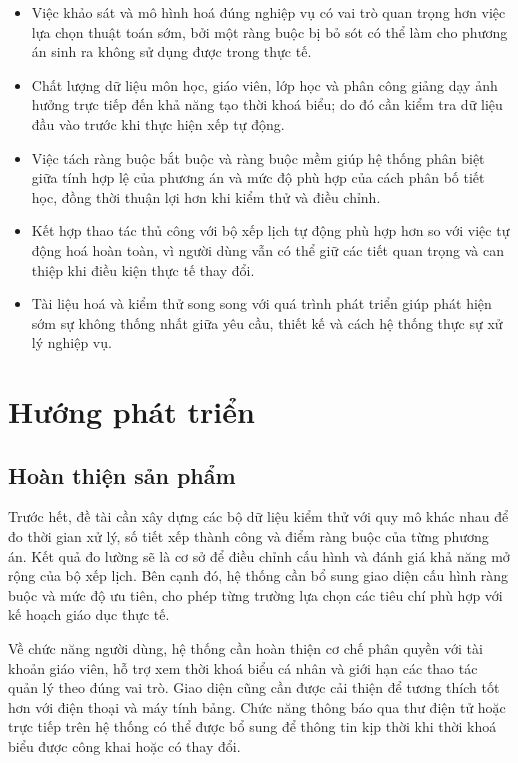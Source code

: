 \documentclass[../DoAn.tex]{subfiles}
\begin{document}
\begin{itemize}[noitemsep]
    \item Việc khảo sát và mô hình hoá đúng nghiệp vụ có vai trò quan trọng hơn
    việc lựa chọn thuật toán sớm, bởi một ràng buộc bị bỏ sót có thể làm cho
    phương án sinh ra không sử dụng được trong thực tế.
    \item Chất lượng dữ liệu môn học, giáo viên, lớp học và phân công giảng dạy
    ảnh hưởng trực tiếp đến khả năng tạo thời khoá biểu; do đó cần kiểm tra dữ
    liệu đầu vào trước khi thực hiện xếp tự động.
    \item Việc tách ràng buộc bắt buộc và ràng buộc mềm giúp hệ thống phân biệt
    giữa tính hợp lệ của phương án và mức độ phù hợp của cách phân bố tiết học,
    đồng thời thuận lợi hơn khi kiểm thử và điều chỉnh.
    \item Kết hợp thao tác thủ công với bộ xếp lịch tự động phù hợp hơn so với
    việc tự động hoá hoàn toàn, vì người dùng vẫn có thể giữ các tiết quan trọng
    và can thiệp khi điều kiện thực tế thay đổi.
    \item Tài liệu hoá và kiểm thử song song với quá trình phát triển giúp phát
    hiện sớm sự không thống nhất giữa yêu cầu, thiết kế và cách hệ thống thực sự
    xử lý nghiệp vụ.
\end{itemize}

\section{Hướng phát triển}
\label{section:5.3}

\subsection{Hoàn thiện sản phẩm}

Trước hết, đề tài cần xây dựng các bộ dữ liệu kiểm thử với quy mô khác nhau để
đo thời gian xử lý, số tiết xếp thành công và điểm ràng buộc của từng phương án.
Kết quả đo lường sẽ là cơ sở để điều chỉnh cấu hình và đánh giá khả năng mở rộng
của bộ xếp lịch. Bên cạnh đó, hệ thống cần bổ sung giao diện cấu hình ràng buộc
và mức độ ưu tiên, cho phép từng trường lựa chọn các tiêu chí phù hợp với kế
hoạch giáo dục thực tế.

Về chức năng người dùng, hệ thống cần hoàn thiện cơ chế phân quyền với tài khoản
giáo viên, hỗ trợ xem thời khoá biểu cá nhân và giới hạn các thao tác quản lý
theo đúng vai trò. Giao diện cũng cần được cải thiện để tương thích tốt hơn với
điện thoại và máy tính bảng. Chức năng thông báo qua thư điện tử hoặc trực tiếp
trên hệ thống có thể được bổ sung để thông tin kịp thời khi thời khoá biểu được
công khai hoặc có thay đổi.
\end{document}
